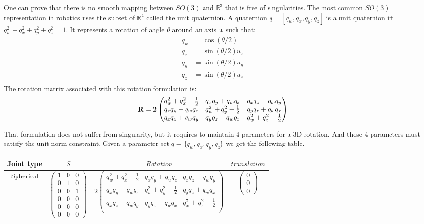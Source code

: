 One can prove that there is no smooth mapping between $SO(3)$ and $\mathbb{R}^3$ that is free of singularities.
The most common $SO(3)$ representation in robotics uses the subset of $\mathbb{R}^4$ called the unit quaternion.
A quaternion $q = [q_w, q_x, q_y, q_z]$ is a unit quaternion iff $q_w^2+q_x^2+q_y^2+q_z^2 = 1$.
It represents a rotation of angle $\theta$ around an axis $\bf{u}$ such that:
\begin{align}
  q_w &= \cos(\theta/2) \\
  q_x &= \sin(\theta/2)u_x \\
  q_y &= \sin(\theta/2)u_y \\
  q_z &= \sin(\theta/2)u_z \\
\end{align}
The rotation matrix associated with this rotation formulation is:
\begin{equation}
  \bf{R} = 2 \begin{pmatrix}
    q_w^2 +q_x^2-\frac{1}{2} & q_x q_y + q_w q_z & q_x q_z - q_w q_y \\
    q_x q_y - q_w q_z & q_w^2 +q_y^2-\frac{1}{2} & q_y q_z + q_w q_x \\
    q_x q_z + q_w q_y & q_y q_z - q_w q_x & q_w^2 +q_z^2-\frac{1}{2} \\
  \end{pmatrix}
\end{equation}

That formulation does not suffer from singularity, but it requires to maintain 4 parameters for a 3D rotation. And those 4 parameters must satisfy the unit norm constraint.
Given a parameter set $q = \{ q_w, q_x, q_y, q_z\}$ we get the following table.

\begin{tabular}{|c|c|c|c|}
  \hline
  Joint type & $S$ & $Rotation$ & $translation$ \\
  \hline
  Spherical
  &
  $\begin{pmatrix}
    1 & 0 & 0 \\ 0 & 1 & 0 \\ 0 & 0 & 1 \\ 0 & 0 & 0 \\ 0 & 0 & 0 \\ 0 & 0 & 0
  \end{pmatrix}$
  &
  $2 \begin{pmatrix}
    q_w^2 +q_x^2-\frac{1}{2} & q_x q_y + q_w q_z & q_x q_z - q_w q_y \\
    q_x q_y - q_w q_z & q_w^2 +q_y^2-\frac{1}{2} & q_y q_z + q_w q_x \\
    q_x q_z + q_w q_y & q_y q_z - q_w q_x & q_w^2 +q_z^2-\frac{1}{2} \\
  \end{pmatrix}$
  &
  $\begin{pmatrix}
    0 \\ 0 \\ 0
  \end{pmatrix}$
  \\
  \hline
\end{tabular}

